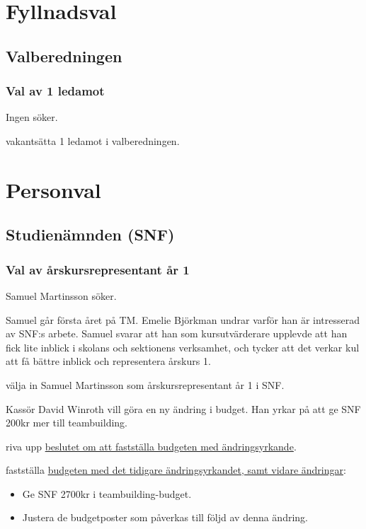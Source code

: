 \documentclass[hidelinks]{../sektionsmote} %
\begin{document}
\section{Fyllnadsval}

\subsection{Valberedningen}

\subsubsection{Val av 1 ledamot}
Ingen söker.
\begin{beslut}
    \item vakantsätta 1 ledamot i valberedningen.
\end{beslut}


\section{Personval}

\subsection{Studienämnden (SNF)}

\subsubsection{Val av årskursrepresentant år 1}
Samuel Martinsson söker.

Samuel går första året på TM.
Emelie Björkman undrar varför han är intresserad av SNF:s arbete.
Samuel svarar att han som kursutvärderare upplevde att han fick lite inblick i skolans och sektionens verksamhet, och tycker att det verkar kul att få bättre inblick och representera årskurs 1.
\begin{beslut}
    \item välja in Samuel Martinsson som årskursrepresentant år 1 i SNF.
\end{beslut}

\begin{ofraga} \label{uppriven-budget}
    Kassör David Winroth vill göra en ny ändring i budget.
    Han yrkar på att ge SNF 200kr mer till teambuilding.
    \begin{beslut}
        \item riva upp \hyperref[budget-orginalbeslut]{beslutet om att fastställa budgeten med ändringsyrkande}.
        \item fastställa \hyperlink{bilagor/styret/ny-budget2.pdf.1}{budgeten med det tidigare ändringsyrkandet, samt vidare ändringar}:
        \begin{itemize}
            \item Ge SNF 2700kr i teambuilding-budget.
            \item Justera de budgetposter som påverkas till följd av denna ändring.
        \end{itemize}
    \end{beslut}
\end{ofraga}
\end{document}
